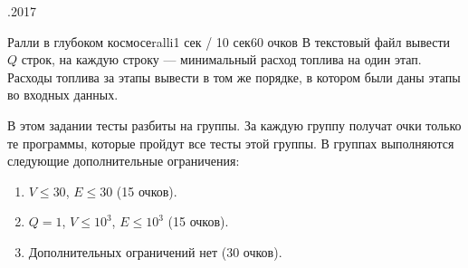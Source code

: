 \documentclass[a4paper,10pt]{article}
\begin{document}
\begin{ol}{\eio}{.2017}{\yle}{}
\begin{yl}{5}{Ралли в глубоком космосе}{ralli}{1 сек / 10 сек}{60 очков}
\val В текстовый файл \valf вывести $Q$ строк, на каждую строку --- минимальный расход топлива на один этап. Расходы топлива за этапы вывести в том же порядке, в котором были даны этапы во входных данных.

\nde[0]{3cm}{3cm}

\hnd В этом задании тесты разбиты на группы. За каждую группу получат очки только те программы, которые пройдут все тесты этой группы. В группах выполняются следующие дополнительные ограничения:

\begin{enumerate}
\item $V \le 30$, $E \le 30$ (15 очков).
\item $Q = 1$, $V \le 10^3$, $E \le 10^3$ (15 очков).
\item Дополнительных ограничений нет (30 очков).
\end{enumerate}

\end{yl}
\end{ol}
\end{document}
